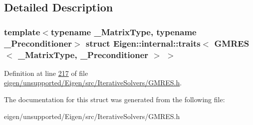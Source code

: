 \subsection{Detailed Description}
\subsubsection*{template$<$typename \+\_\+\+Matrix\+Type, typename \+\_\+\+Preconditioner$>$\newline
struct Eigen\+::internal\+::traits$<$ G\+M\+R\+E\+S$<$ \+\_\+\+Matrix\+Type, \+\_\+\+Preconditioner $>$ $>$}



Definition at line \hyperlink{eigen_2unsupported_2_eigen_2src_2_iterative_solvers_2_g_m_r_e_s_8h_source_l00217}{217} of file \hyperlink{eigen_2unsupported_2_eigen_2src_2_iterative_solvers_2_g_m_r_e_s_8h_source}{eigen/unsupported/\+Eigen/src/\+Iterative\+Solvers/\+G\+M\+R\+E\+S.\+h}.



The documentation for this struct was generated from the following file\+:\begin{DoxyCompactItemize}
\item 
eigen/unsupported/\+Eigen/src/\+Iterative\+Solvers/\+G\+M\+R\+E\+S.\+h\end{DoxyCompactItemize}
